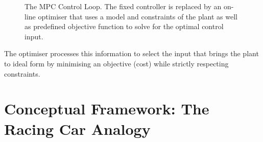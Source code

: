 \begin{figure}[t]
	\caption{The MPC Control Loop. The fixed controller is replaced by an on-line optimiser that uses a model and constraints of the plant as well as predefined objective function to solve for the optimal control input.}
	\label{fig:mpc_loop}
\end{figure}


The optimiser processes this information to select the input that brings the plant to ideal form by minimising an objective (cost) while strictly respecting constraints. 

\section{Conceptual Framework: The Racing Car Analogy}

